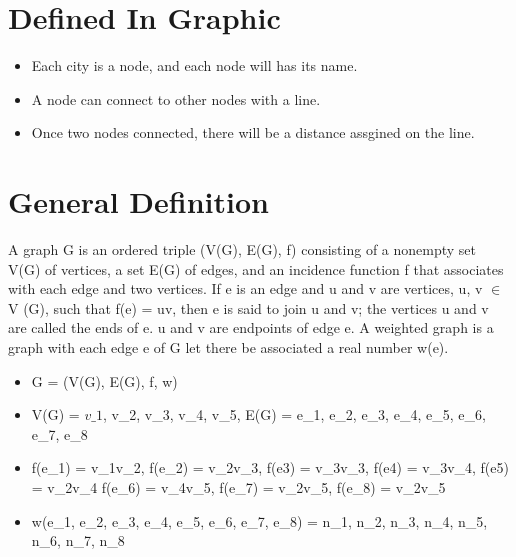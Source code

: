 \documentclass[12pt]{article}
\begin{document}
\section{Defined In Graphic}
\begin{itemize}
    \item Each city is a node, and each node will has its name.
    \item A node can connect to other nodes with a line.
    \item Once two nodes connected, there will be a distance assgined on the line.
\end{itemize}

\section{General Definition}
A graph G is an ordered triple (V(G), E(G), f) consisting of a nonempty set V(G) of vertices, a set E(G) of edges, 
and an incidence function f that associates with each edge and two vertices. If e is an edge and u and v are vertices, 
u, v $\in$  V (G), such that f(e) = uv, then e is said to join u and v; the vertices u and v are called the ends of e. u 
and v are endpoints of edge e. A weighted graph is a graph with each edge e of G let there be associated a real number w(e).
\begin{itemize}
    \item G = (V(G), E(G), f, w)
    \item V(G) = {$v\_1$, v\_2, v\_3, v\_4, v\_5}, E(G) = {e\_1, e\_2, e\_3, e\_4, e\_5, e\_6, e\_7, e\_8}
    \item f(e\_1) = v\_1v\_2, f(e\_2) = v\_2v\_3, f(e3) = v\_3v\_3, f(e4) = v\_3v\_4, f(e5) = v\_2v\_4
    f(e\_6) = v\_4v\_5, f(e\_7) = v\_2v\_5, f(e\_8) = v\_2v\_5
    \item w(e\_1, e\_2, e\_3, e\_4, e\_5, e\_6, e\_7, e\_8) = n\_1, n\_2, n\_3, n\_4, n\_5, n\_6, n\_7, n\_8
\end{itemize}
\end{document}

